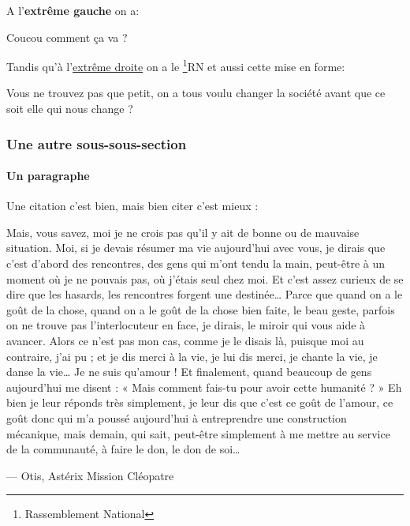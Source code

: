 A l'\textbf{extrême gauche} on a:
\begin{flushleft}
    Coucou comment ça va ?
\end{flushleft}

Tandis qu'à l'\underline{extrême droite} on a le \href{https://rassemblementnational.fr/}{\footnote{Rassemblement National}{RN}} et aussi cette mise en forme:

\begin{flushright}
    Vous ne trouvez pas que petit, on a tous voulu changer la société avant que ce soit elle qui nous change ?
\end{flushright}

\subsubsection{Une autre sous-sous-section}
\paragraph{Un paragraphe}
Une citation c'est bien, mais bien citer c'est mieux :

\begin{quoting}
    Mais, vous savez, moi je ne crois pas qu’il y ait de bonne ou de mauvaise situation. Moi, si je devais résumer ma vie aujourd’hui avec vous, je dirais que c’est d’abord des rencontres, des gens qui m’ont tendu la main, peut-être à un moment où je ne pouvais pas, où j’étais seul chez moi. Et c’est assez curieux de se dire que les hasards, les rencontres forgent une destinée… Parce que quand on a le goût de la chose, quand on a le goût de la chose bien faite, le beau geste, parfois on ne trouve pas l’interlocuteur en face, je dirais, le miroir qui vous aide à avancer. Alors ce n’est pas mon cas, comme je le disais là, puisque moi au contraire, j’ai pu ; et je dis merci à la vie, je lui dis merci, je chante la vie, je danse la vie… Je ne suis qu’amour ! Et finalement, quand beaucoup de gens aujourd’hui me disent : « Mais comment fais-tu pour avoir cette humanité ? » Eh bien je leur réponds très simplement, je leur dis que c’est ce goût de l’amour, ce goût donc qui m’a poussé aujourd’hui à entreprendre une construction mécanique, mais demain, qui sait, peut-être simplement à me mettre au service de la communauté, à faire le don, le don de soi…
    \begin{flushright}
        --- Otis, Astérix Mission Cléopatre
    \end{flushright}
\end{quoting}

